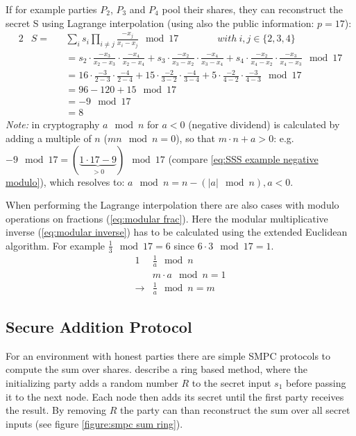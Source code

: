 If for example parties $P_2$, $P_3$ and $P_4$ pool their shares, they can reconstruct the secret S using Lagrange interpolation (using also the public information: $p=17$):
\begin{alignat}{2}
& S = && \sum_i s_i \prod_{i \neq j} \frac{-x_j}{x_i - x_j } \mod 17 \qquad \qquad  with \ i,j \in \{2,3,4\} \\
& \quad && =s_2 \cdot \frac{-x_3}{x_2-x_3} \cdot \frac{-x_4}{x_2-x_4} + s_3 \cdot \frac{-x_2}{x_3-x_2} \cdot \frac{-x_4}{x_3-x_4} + s_4 \cdot \frac{-x_2}{x_4-x_2} \cdot \frac{-x_3}{x_4-x_3} \mod 17 \nonumber \\
& \quad && =16 \cdot \frac{-3}{2-3} \cdot \frac{-4}{2-4} + 15 \cdot \frac{-2}{3-2} \cdot \frac{-4}{3-4} + 5 \cdot \frac{-2}{4-2} \cdot \frac{-3}{4-3} \mod 17  \nonumber \\
& \quad && = 96-120+15 \mod 17 \nonumber \\
& \quad && = -9 \mod 17 \label{eq:SSS example negative modulo} \\
& \quad && = 8 \nonumber 
\end{alignat}
\textit{Note:} in cryptography $a \mod n$ for $a<0$ (negative dividend) is calculated by adding a multiple of  $n$ ($mn\mod n=0$), so that $m \cdot n+a>0$: e.g. $-9 \mod 17 = (\underbrace{1 \cdot 17-9}_{>0}) \mod 17$ (compare \ref{eq:SSS example negative modulo}), which resolves to: $a\mod n = n-(|a|\mod n), a<0$.

When performing the Lagrange interpolation there are also cases with modulo operations on fractions (\autoref{eq:modular frac}). Here the modular multiplicative inverse (\autoref{eq:modular inverse}) has to be calculated using the extended Euclidean algorithm. For example $\frac{1}{3}\mod 17=6$ since $6\cdot 3\mod 17=1$.
\begin{alignat}{1}
& \frac{1}{a}\mod n \label{eq:modular frac} \\
& m\cdot a\mod n=1 \label{eq:modular inverse} \\
 \rightarrow & \frac{1}{a}\mod n=m \label{eq:modular frac result}
\end{alignat}

\subsection{Secure Addition Protocol} \label{Secure Addition Protocol}

For an environment with honest parties there are simple \gls{SMPC} protocols to compute the sum over shares. \textcite{Clifton2002} describe a ring based method, where the initializing party adds a random number $R$ to the secret input $s_1$ before passing it to the next node. Each node then adds its secret until the first party receives the result. By removing $R$ the party can than reconstruct the sum over all secret inputs (see figure \ref{figure:smpc sum ring}).

